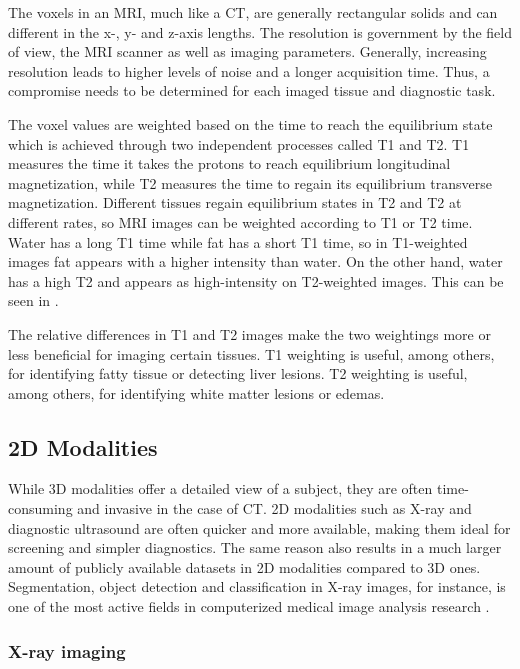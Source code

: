 The voxels in an MRI, much like a CT, are generally rectangular solids and can different in the x-, y- and z-axis lengths. The resolution is government by the field of view, the MRI scanner as well as imaging parameters. Generally, increasing resolution leads to higher levels of noise and a longer acquisition time. Thus, a compromise needs to be determined for each imaged tissue and diagnostic task. 

The voxel values are weighted based on the time to reach the equilibrium state which is achieved through two independent processes called T1 and T2. T1 measures the time it takes the protons to reach equilibrium longitudinal magnetization, while T2 measures the time to regain its equilibrium transverse magnetization. Different tissues regain equilibrium states in T2 and T2 at different rates, so MRI images can be weighted according to T1 or T2 time. Water has a long T1 time while fat has a short T1 time, so in T1-weighted images fat appears with a higher intensity than water. On the other hand, water has a high T2 and appears as high-intensity on T2-weighted images. This can be seen in .


The relative differences in T1 and T2 images make the two weightings more or less beneficial for imaging certain tissues. T1 weighting is useful, among others, for identifying fatty tissue or detecting liver lesions. T2 weighting is useful, among others, for identifying white matter lesions or edemas.

\subsection{2D Modalities}

While 3D modalities offer a detailed view of a subject, they are often time-consuming and invasive in the case of CT. 2D modalities such as X-ray and diagnostic ultrasound are often quicker and more available, making them ideal for screening and simpler diagnostics. The same reason also results in a much larger amount of publicly available datasets in 2D modalities compared to 3D ones. Segmentation, object detection and classification in X-ray images, for instance, is one of the most active fields in computerized medical image analysis research \cite{nguyen2020vindrcxr, irvinCheXpertLargeChest2019}.

\subsubsection{X-ray imaging}

